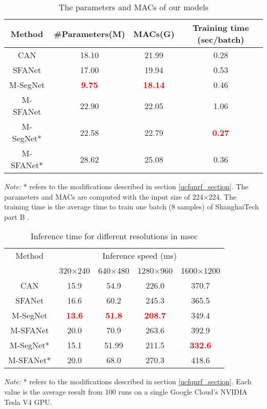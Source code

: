 \documentclass[10pt, conference, a4paper]{IEEEtran}
\begin{document}
\setlength{\tabcolsep}{4pt}
\begin{table}
\begin{center}
\caption{The parameters and MACs of our models}
\begin{tabular}{c|c|c|c}
\hline
Method & \#Parameters(M) & MACs(G) & Training time (sec/batch)\\
\hline
CAN \cite{liu2019context} & 18.10 & 21.99 & 0.28\\
SFANet \cite{zhu2019dual} & 17.00 & 19.94 & 0.53\\
\hline
M-SegNet & \textbf{\textcolor{red}{9.75}} & \textbf{\textcolor{red}{18.14}} & 0.46\\
M-SFANet & 22.90 & 22.05 & 1.06\\
M-SegNet* & 22.58 & 22.79 & \textbf{\textcolor{red}{0.27}}\\
M-SFANet* & 28.62 & 25.08 & 0.36\\
\hline
\end{tabular}
\label{table:params}
\end{center}
\footnotesize\emph{Note:} * refers to the modifications described in section \ref{ucfqnrf_section}. The parameters and MACs are computed with the input size of 224×224. The training time is the average time to train one batch (8 samples) of ShanghaiTech part B \cite{zhang2016single}.
\end{table}
\setlength{\tabcolsep}{1.4pt} \setlength{\tabcolsep}{4pt}
\begin{table}
\begin{center}
\caption{Inference time for different resolutions in msec}
\begin{tabular}{|c|c|c|c|c|}
\hline
Method & \multicolumn{4}{c|}{Inference speed (ms)}\\\cline{2-5}
& 320×240 & 640×480 & 1280×960 & 1600×1200\\
\hline
CAN \cite{liu2019context}&15.9&54.9&226.0&370.7\\
SFANet \cite{zhu2019dual}&16.6&60.2&245.3&365.5\\
\hline
M-SegNet&\textbf{\textcolor{red}{13.6}}&\textbf{\textcolor{red}{51.8}}&\textbf{\textcolor{red}{208.7}}&349.4\\
M-SFANet&20.0&70.9&263.6&392.9\\
M-SegNet*&15.1&51.99&211.5&\textbf{\textcolor{red}{332.6}}\\
M-SFANet*&20.0&68.0&270.3&418.6\\
\hline
\end{tabular}
\label{table:inferspeed}
\end{center}
\footnotesize\emph{Note:} * refers to the modifications described in section \ref{ucfqnrf_section}. Each value is the average result from 100 runs on a single Google Cloud's NVIDIA Tesla V4 GPU.
\end{table}
\setlength{\tabcolsep}{1.4pt} 
\end{document}
